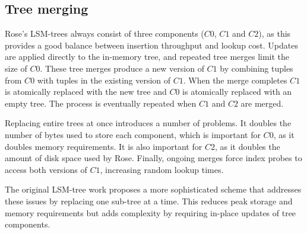 \documentclass{vldb}
\newcommand{\rows}{Rose\xspace}
\newcommand{\rowss}{Rose's\xspace}
\newcommand{\xxx}[1]{\textcolor{red}{\bf XXX: #1}}
\renewcommand{\xxx}[1]{\xspace}
\begin{document}

\subsection{Tree merging}


\rowss LSM-trees always consist of three components ($C0$, $C1$ and
$C2$), as this provides a good balance between insertion throughput
and lookup cost.
Updates are applied directly to the in-memory tree, and repeated tree merges
limit the size of $C0$.  These tree
merges produce a new version of $C1$ by combining tuples from $C0$ with
tuples in the existing version of $C1$.  When the merge completes
$C1$ is atomically replaced with the new tree and $C0$ is atomically
replaced with an empty tree.  The process is eventually repeated when
$C1$ and $C2$ are merged.

Replacing entire trees at once introduces a number of problems.  It
doubles the number of bytes used to store each component, which is
important for $C0$, as it doubles memory requirements.  It is also
important for $C2$, as it doubles the amount of disk space used by
\rows.  Finally, ongoing merges force index probes to access both versions of $C1$,
increasing random lookup times.

The original LSM-tree work proposes a more sophisticated scheme that
addresses these issues by replacing one sub-tree at a time.  This
reduces peak storage and memory requirements but adds complexity
by requiring in-place updates of tree components.
\end{document}
